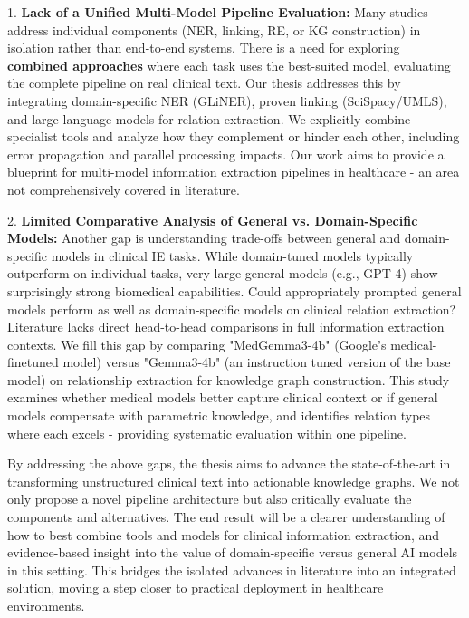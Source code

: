 1. \textbf{Lack of a Unified Multi-Model Pipeline Evaluation:} Many studies address individual components (NER, linking, RE, or KG construction) in isolation rather than end-to-end systems. There is a need for exploring \textbf{combined approaches} where each task uses the best-suited model, evaluating the complete pipeline on real clinical text. Our thesis addresses this by integrating domain-specific NER (GLiNER), proven linking (SciSpacy/UMLS), and large language models for relation extraction. We explicitly combine specialist tools and analyze how they complement or hinder each other, including error propagation and parallel processing impacts. Our work aims to provide a blueprint for multi-model information extraction pipelines in healthcare - an area not comprehensively covered in literature.

2. \textbf{Limited Comparative Analysis of General vs. Domain-Specific Models:} Another gap is understanding trade-offs between general and domain-specific models in clinical IE tasks. While domain-tuned models typically outperform on individual tasks, very large general models (e.g., GPT-4) show surprisingly strong biomedical capabilities. Could appropriately prompted general models perform as well as domain-specific models on clinical relation extraction? Literature lacks direct head-to-head comparisons in full information extraction contexts. We fill this gap by comparing "MedGemma3-4b" (Google's medical-finetuned model) versus "Gemma3-4b" (an instruction tuned version of the base model) on relationship extraction for knowledge graph construction. This study examines whether medical models better capture clinical context or if general models compensate with parametric knowledge, and identifies relation types where each excels - providing systematic evaluation within one pipeline.

By addressing the above gaps, the thesis aims to advance the state-of-the-art in transforming unstructured clinical text into actionable knowledge graphs. We not only propose a novel pipeline architecture but also critically evaluate the components and alternatives. The end result will be a clearer understanding of how to best combine tools and models for clinical information extraction, and evidence-based insight into the value of domain-specific versus general AI models in this setting. This bridges the isolated advances in literature into an integrated solution, moving a step closer to practical deployment in healthcare environments.
